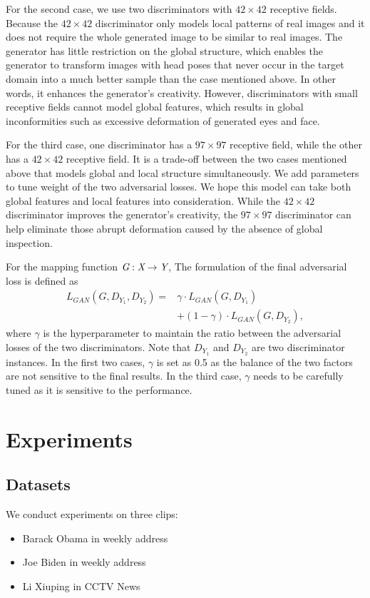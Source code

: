 \documentclass[letterpaper]{article} %
\begin{document}
	For the second case, we use two discriminators with $42\times42$ receptive fields. Because the $42\times42$ discriminator only models local patterns of real images and it does not require the whole generated image to be similar to real images. The generator has little restriction on the global structure, which enables the generator to transform images with head poses that never occur in the target domain into a much better sample than the case mentioned above. In other words, it enhances the generator's creativity. However, discriminators with small receptive fields cannot model global features, which results in global inconformities such as excessive deformation of generated eyes and face.  
	
	For the third case, one discriminator has a $97\times97$ receptive field, while the other has a $42\times42$ receptive field. It is a trade-off between the two cases mentioned above that models global and local structure simultaneously. We add parameters to tune weight of the two adversarial losses. We hope this model can take both global features and local features into consideration. While the $42\times42$ discriminator improves the generator's creativity, the $97\times97$ discriminator can help eliminate those abrupt deformation caused by the absence of global inspection.
	
	For the mapping function $ \emph{G} : \emph{X} \rightarrow \emph{Y} $, The formulation of the final adversarial loss is defined as
	\begin{align}
	L_{GAN}(G,D_{Y_1},D_{Y_2}) =& \gamma \cdot L_{GAN}(G,D_{Y_1})\nonumber\\&+(1-\gamma)\cdot L_{GAN}(G,D_{Y_2}),
	\end{align}
	where $\gamma$ is the hyperparameter to maintain the ratio between the adversarial losses of the two discriminators.
	Note that $D_{Y_1}$ and $D_{Y_2}$ are two discriminator instances. In the first two cases, $\gamma$ is set as 0.5 as the balance of the two factors are not sensitive to the final results. In the third case, $\gamma$ needs to be carefully tuned as it is sensitive to the performance.
	
	\section{Experiments} \label{Experiments}
	\subsection{Datasets}
	We conduct experiments on three clips:
	\begin{itemize}
		\item Barack Obama in weekly address%
		\item Joe Biden in weekly address%
		\item Li Xiuping in CCTV News%
	\end{itemize}
	
\end{document}
